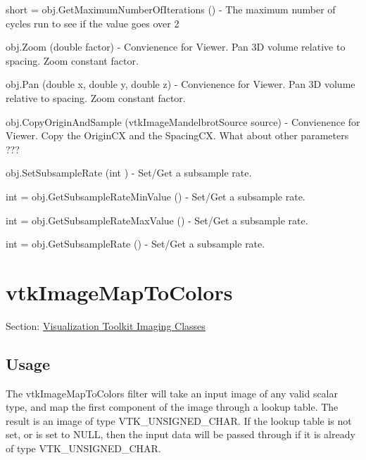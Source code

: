 \begin{DoxyItemize}
\item {\ttfamily short = obj.\-Get\-Maximum\-Number\-Of\-Iterations ()} -\/ The maximum number of cycles run to see if the value goes over 2  
\item {\ttfamily obj.\-Zoom (double factor)} -\/ Convienence for Viewer. Pan 3\-D volume relative to spacing. Zoom constant factor.  
\item {\ttfamily obj.\-Pan (double x, double y, double z)} -\/ Convienence for Viewer. Pan 3\-D volume relative to spacing. Zoom constant factor.  
\item {\ttfamily obj.\-Copy\-Origin\-And\-Sample (vtk\-Image\-Mandelbrot\-Source source)} -\/ Convienence for Viewer. Copy the Origin\-C\-X and the Spacing\-C\-X. What about other parameters ???  
\item {\ttfamily obj.\-Set\-Subsample\-Rate (int )} -\/ Set/\-Get a subsample rate.  
\item {\ttfamily int = obj.\-Get\-Subsample\-Rate\-Min\-Value ()} -\/ Set/\-Get a subsample rate.  
\item {\ttfamily int = obj.\-Get\-Subsample\-Rate\-Max\-Value ()} -\/ Set/\-Get a subsample rate.  
\item {\ttfamily int = obj.\-Get\-Subsample\-Rate ()} -\/ Set/\-Get a subsample rate.  
\end{DoxyItemize}\hypertarget{vtkimaging_vtkimagemaptocolors}{}\section{vtk\-Image\-Map\-To\-Colors}\label{vtkimaging_vtkimagemaptocolors}
Section\-: \hyperlink{sec_vtkimaging}{Visualization Toolkit Imaging Classes} \hypertarget{vtkwidgets_vtkxyplotwidget_Usage}{}\subsection{Usage}\label{vtkwidgets_vtkxyplotwidget_Usage}
The vtk\-Image\-Map\-To\-Colors filter will take an input image of any valid scalar type, and map the first component of the image through a lookup table. The result is an image of type V\-T\-K\-\_\-\-U\-N\-S\-I\-G\-N\-E\-D\-\_\-\-C\-H\-A\-R. If the lookup table is not set, or is set to N\-U\-L\-L, then the input data will be passed through if it is already of type V\-T\-K\-\_\-\-U\-N\-S\-I\-G\-N\-E\-D\-\_\-\-C\-H\-A\-R.

